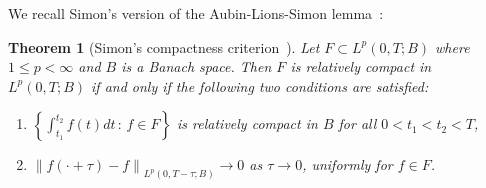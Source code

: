 \documentclass[10pt,letterpaper]{amsart}
\newcommand\norm[1]{\left\lVert#1\right\rVert}
\newtheorem{theorem}[lemma]{Theorem}
\theoremstyle{definition}{\newtheorem{definition}[lemma]{Definition}}
\numberwithin{equation}{section}
\begin{document}
We recall Simon's version of the Aubin-Lions-Simon lemma~\cite[Theorem 1]{Simon1987}:
\begin{theorem}[Simon's compactness criterion~\cite{Simon1987}]
	\label{thm:Simonlemma}
	Let $F\subset L^p(0,T;B)$ where $1\leq p<\infty$ and $B$ is a Banach space. Then $F$ is relatively compact in $L^p(0,T;B)$ if and only if the following two conditions are satisfied:
	\begin{enumerate}
		\item $\left\{\int_{t_1}^{t_2} f(t) dt \, : \, f\in F\right\}$ is relatively compact in $B$ for all $0<t_1<t_2<T$,  \label{cond1} 
		
		\item $\norm{f(\cdot + \tau)-f}_{L^p(0,T-\tau;B)}\longrightarrow 0$ as $\tau\to 0$, uniformly for $f\in F$.   \label{cond2}
	\end{enumerate}
	
\end{theorem}



\end{document}
